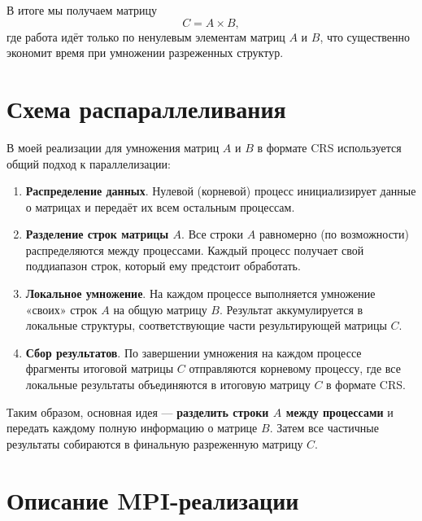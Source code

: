 \documentclass[12pt]{article}
\begin{document}
В итоге мы получаем матрицу 
\[
C = A \times B,
\]
где работа идёт только по ненулевым элементам матриц \(A\) и \(B\), что существенно экономит время при умножении разреженных структур.


\section{Схема распараллеливания}

В моей реализации для умножения матриц \(A\) и \(B\) в формате CRS используется общий подход к параллелизации:

\begin{enumerate}
    \item \textbf{Распределение данных}. 
    Нулевой (корневой) процесс инициализирует данные о матрицах и передаёт их всем остальным процессам.
    
    \item \textbf{Разделение строк матрицы \(A\)}. 
    Все строки \(A\) равномерно (по возможности) распределяются между процессами. Каждый процесс получает свой поддиапазон строк, который ему предстоит обработать.
    
    \item \textbf{Локальное умножение}. 
    На каждом процессе выполняется умножение «своих» строк \(A\) на общую матрицу \(B\). Результат аккумулируется в локальные структуры, соответствующие части результирующей матрицы \(C\).
    
    \item \textbf{Сбор результатов}. 
    По завершении умножения на каждом процессе фрагменты итоговой матрицы \(C\) отправляются корневому процессу, где все локальные результаты объединяются в итоговую матрицу \(C\) в формате CRS.
\end{enumerate}

Таким образом, основная идея --- \textbf{разделить строки \(A\) между процессами} и передать каждому полную информацию о матрице \(B\). Затем все частичные результаты собираются в финальную разреженную матрицу \(C\). 



\section{Описание MPI-реализации}
\end{document}
